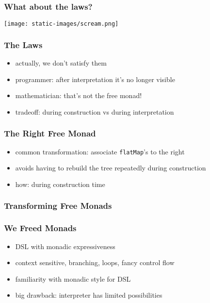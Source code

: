 \documentclass{beamer}
\begin{document}
\begin{frame}[fragile]
  \frametitle{What about the laws?}
  \begin{center}
    \texttt{[image: static-images/scream.png]}
  \end{center}
\end{frame}

\begin{frame}[fragile]
  \frametitle{The Laws}
  \begin{itemize}
  \item actually, we don't satisfy them
  \item programmer: after interpretation it's no longer visible
  \item mathematician: that's not the free monad!
  \item tradeoff: during construction vs during interpretation
  \end{itemize}
\end{frame}

\begin{frame}[fragile]
  \frametitle{The Right Free Monad}
  \begin{itemize}
  \item common transformation: associate \texttt{flatMap}'s to the right
  \item avoids having to rebuild the tree repeatedly during construction
  \item how: during construction time
  \end{itemize}
\end{frame}

\begin{frame}[fragile]
  \frametitle{Transforming Free Monads}
\end{frame}

\begin{frame}
  \frametitle{We Freed Monads}
  \begin{itemize}
  \item DSL with monadic expressiveness
  \item context sensitive, branching, loops, fancy control flow
  \item familiarity with monadic style for DSL
  \item big drawback: interpreter has limited possibilities
  \end{itemize}
\end{frame}
\end{document}
